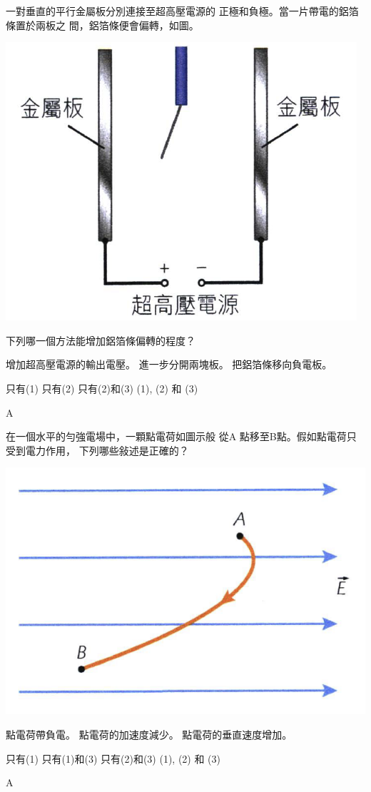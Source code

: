 {
    一對垂直的平行金屬板分別連接至超高壓電源的 正極和負極。當一片帶電的鋁箔條置於兩板之 間，鋁箔條便會偏轉，如圖。
    \par{\par\centering\includegraphics[width=.35\textwidth]{./img/ch1_electrostatics_mc_2024-06-18-17-22-18.png}\par}
    下列哪一個方法能增加鋁箔條偏轉的程度？
    \begin{statements}
        \task 增加超高壓電源的輸出電壓。
        \task 進一步分開兩塊板。
        \task 把鋁箔條移向負電板。
    \end{statements}
    \begin{tasks}
        \task 只有(1)
        \task 只有(2)
        \task 只有(2)和(3)
        \task (1), (2) 和 (3)
    \end{tasks}
}{A}

{
    在一個水平的勻強電場中，一顆點電荷如圖示般 從A 點移至B點。假如點電荷只受到電力作用， 下列哪些敍述是正確的？
    \par{\par\centering\includegraphics[width=.35\textwidth]{./img/ch1_electrostatics_mc_2024-06-18-17-23-24.png}\par}
    \begin{statements}
        \task 點電荷帶負電。
        \task 點電荷的加速度減少。
        \task 點電荷的垂直速度增加。
    \end{statements}
    \begin{tasks}
        \task 只有(1)
        \task 只有(1)和(3)
        \task 只有(2)和(3)
        \task (1), (2) 和 (3)
    \end{tasks}
}{A}